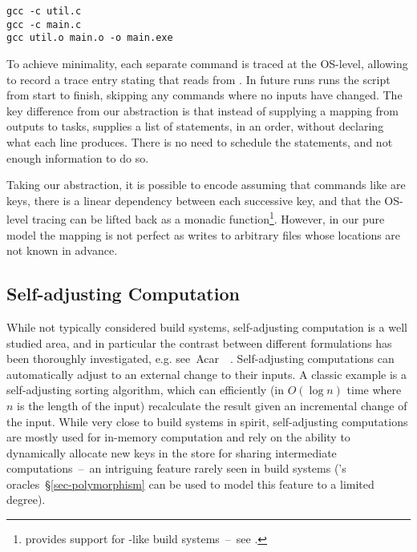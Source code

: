 \vspace{1mm}
\begin{verbatim}
gcc -c util.c
gcc -c main.c
gcc util.o main.o -o main.exe
\end{verbatim}
\vspace{1mm}

\noindent
To achieve minimality, each separate command is traced at the OS-level, allowing
\Fabricate to record a trace entry stating that  reads from
. In future runs \Fabricate runs the script from start to finish,
skipping any commands where no inputs have changed. The key difference from our
 abstraction is that instead of supplying a mapping from outputs to
tasks, \Fabricate supplies a list of statements, in an order, without declaring
what each line produces. There is no need to schedule the statements, and not
enough information to do so.

Taking our abstraction, it is possible to encode \Fabricate assuming that
commands like  are keys, there is a linear dependency between
each successive key, and that the OS-level tracing can be lifted back as a
monadic  function\footnote{\Shake provides support for
\Fabricate{}-like build systems~--~see .}.
However, in our pure model the mapping is not perfect as  writes to
arbitrary files whose locations are not known in advance.

\subsection{Self-adjusting Computation}

While not typically considered build systems, self-adjusting computation is a
well studied area, and in particular the contrast between different formulations
has been thoroughly investigated, e.g.
see~Acar~\etal~. Self-adjusting computations
can automatically adjust to an external change to their inputs. A classic
example is a self-adjusting sorting algorithm, which can efficiently (in
$O(\log{n})$ time where $n$ is the length of the input) recalculate the result
given an incremental change of the input. While very close to build systems in
spirit, self-adjusting computations are mostly used for in-memory computation
and rely on the ability to dynamically allocate new keys in the store for
sharing intermediate computations~--~an intriguing feature rarely seen in build
systems (\Shake's oracles~\S\ref{sec-polymorphism} can be used to model this
feature to a limited degree).

